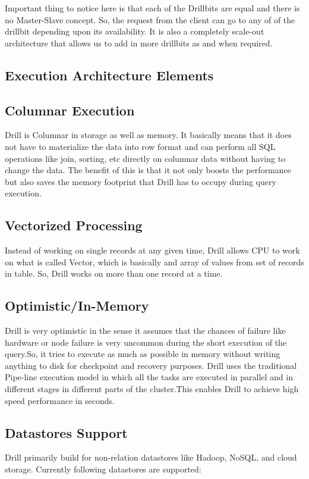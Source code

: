 \documentclass[9pt,twocolumn,twoside]{styles/osajnl}
\begin{document}
Important thing to notice here is that each of the Drillbits are equal and there is no Master-Slave concept. So, the request from the client can go to any of of the drillbit depending upon its availability. It is also a completely scale-out architecture that allows us to add in more drillbits as and when required\cite{Query-Execution}.


\subsection{Execution Architecture Elements}
\subsection{Columnar Execution}

Drill is Columnar in storage as well as memory. It basically means that it does not have to materialize the data into row format and can perform all SQL operations like join, sorting, etc directly on columnar data  without having to change the data. The benefit of this is that it not only boosts the performance but also saves the memory footprint that Drill has to occupy during query execution.

\subsection{Vectorized Processing}
Instead of working on single records at any given time, Drill allows CPU to work on what is called Vector, which is basically and array of values from set of records in table. So, Drill works on more than one record at a time.

\subsection*{Optimistic/In-Memory}
Drill is very optimistic in the sense it assumes that the chances of failure like hardware or node failure is very uncommon during the short execution of the query.So, it tries to execute as much as possible in memory without writing anything to disk for checkpoint and recovery purposes. Drill uses the traditional Pipe-line execution model in which all the tasks are executed in parallel and in different stages in different parts of the cluster.This enables Drill to achieve high speed performance in seconds.

\subsection{Datastores Support}
Drill primarily build for non-relation datastores like Hadoop, NoSQL, and cloud storage.
Currently following datastores are supported:
\end{document}
